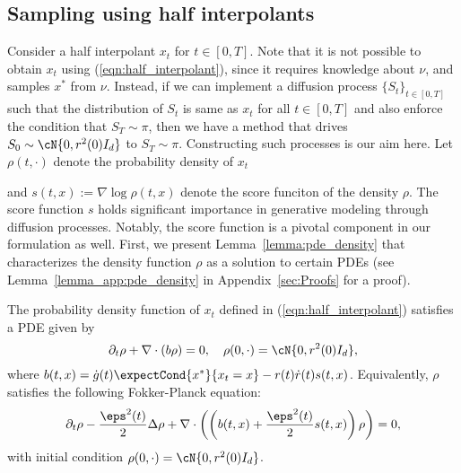 \subsection{Sampling using half  interpolants}
Consider a half interpolant $x_t$ for $t\in[0,T]$. Note that it is not possible to obtain $x_t$ using (\ref{eqn:half_interpolant}),  since it requires knowledge about $\nu$, and samples $x^*$ from $\nu$. Instead, if we can implement a diffusion process $\{S_t\}_{t\in[0,T]}$ such that the distribution of $S_t$ is same as $x_t$ for all $t\in[0,T]$ and also enforce the condition that $S_T\sim\pi$, then we have a method that drives $S_0\sim\cN{0,r^2(0)I_d}$ to $S_T\sim\pi$. Constructing such processes is our aim here.  Let $\rho(t,\cdot)$ denote the probability density of $x_t$
\iffalse
Explicitly, $\rho$ is given by
\begin{align*}
    \rho(t,x) &= \frac{1}{(2\pi r^2(t))^{d/2}}\int_{\R^d}\nu(x^*)e^{-\frac{\norm{x-g(t)x^*}^2}{2r^2(t)}}dx^*.\\
\end{align*}
\fi
and $s(t,x) := \nabla\log{\rho(t,x)}$ denote the score funciton of the density $\rho$. The score function $s$ holds significant importance in generative modeling through diffusion processes. Notably, the score function is a pivotal component in our formulation as well. First, we present Lemma~\ref{lemma:pde_density} that characterizes the density function $\rho$ as a solution to certain PDEs \cite{albergo_stochastic_2023} (see Lemma~\ref{lemma_app:pde_density} in Appendix~\ref{sec:Proofs} for a proof).
\begin{lemma}\label{lemma:pde_density}
The probability density function of $x_t$ defined in (\ref{eqn:half_interpolant}) satisfies a PDE given by
\begin{equation}\label{eqn:first_order_pde}
    \partial_t\rho+\nabla\cdot(b\rho) = 0,\quad \rho(0,\cdot) = \cN{0,r^2(0)I_d},
\end{equation}
where $b(t,x) = \dot g(t)\expectCond{x^*}{x_t=x}-r(t)\dot r(t)s(t,x)$. Equivalently, $\rho$ satisfies the following Fokker-Planck equation:
\begin{equation}\label{eqn:FPE}
    \partial_t\rho-\frac{\eps^2(t)}{2}\Delta\rho+\nabla\cdot\left(\left(b(t,x)+\frac{\eps^2(t)}{2}s(t,x)\right)\rho\right) = 0,%
\end{equation}
with initial condition $\rho(0,\cdot) = \cN{0,r^2(0)I_d}$.
\end{lemma}

